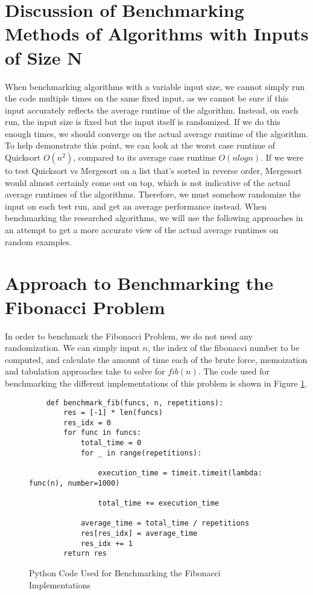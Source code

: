 \section{Discussion of Benchmarking Methods of Algorithms with Inputs of Size N}
When benchmarking algorithms with a variable input size, we cannot simply run the code multiple times on the same fixed input,
as we cannot be sure if this input accurately reflects the average runtime of the algorithm.
Instead, on each run, the input size is fixed but the input itself is randomized.
If we do this enough times, we should converge on the actual average runtime of the algorithm.
To help demonstrate this point, we can look at the worst case runtime of Quicksort $O(n^2)$, compared to its average case runtime $O(nlogn)$.
If we were to test Quicksort vs Mergesort on a list that's sorted in reverse order, Mergesort would almost certainly come out on top, which is not indicative of the actual average runtimes of the algorithms.
Therefore, we must somehow randomize the input on each test run, and get an average performance instead.
When benchmarking the researched algorithms, we will use the following approaches in an attempt to get a more accurate view of the actual average runtimes on random examples.


\section{Approach to Benchmarking the Fibonacci Problem}

In order to benchmark the Fibonacci Problem, we do not need any randomization. We can simply input $n$, the index of the fibonacci number to be computed, and calculate the amount of time each of the brute force, memoization and tabulation approaches take to solve for $fib(n)$.
The code used for benchmarking the different implementations of this problem is shown in Figure \ref{fig:bm-fibonacci}.

\begin{figure}[H]
    \centering
    \begin{lstlisting}
    def benchmark_fib(funcs, n, repetitions):
        res = [-1] * len(funcs)
        res_idx = 0
        for func in funcs:
            total_time = 0
            for _ in range(repetitions):
    
                execution_time = timeit.timeit(lambda: func(n), number=1000)
    
                total_time += execution_time
    
            average_time = total_time / repetitions
            res[res_idx] = average_time
            res_idx += 1
        return res
    \end{lstlisting}
    \caption{Python Code Used for Benchmarking the Fibonacci Implementations}
    \label{fig:bm-fibonacci}
\end{figure}

